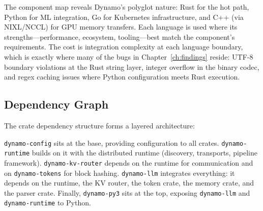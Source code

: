 \begin{notebox}
The component map reveals Dynamo's polyglot nature: Rust for the hot path, Python for ML integration, Go for Kubernetes infrastructure, and C++ (via NIXL/NCCL) for GPU memory transfers. Each language is used where its strengths---performance, ecosystem, tooling---best match the component's requirements. The cost is integration complexity at each language boundary, which is exactly where many of the bugs in Chapter~\ref{ch:findings} reside: UTF-8 boundary violations at the Rust string layer, integer overflow in the binary codec, and regex caching issues where Python configuration meets Rust execution.
\end{notebox}

\subsection{Dependency Graph}

The crate dependency structure forms a layered architecture:

\begin{center}
\end{center}

\texttt{dynamo-config} sits at the base, providing configuration to all crates. \texttt{dynamo-runtime} builds on it with the distributed runtime (discovery, transports, pipeline framework). \texttt{dynamo-kv-router} depends on the runtime for communication and on \texttt{dynamo-tokens} for block hashing. \texttt{dynamo-llm} integrates everything: it depends on the runtime, the KV router, the token crate, the memory crate, and the parser crate. Finally, \texttt{dynamo-py3} sits at the top, exposing \texttt{dynamo-llm} and \texttt{dynamo-runtime} to Python.

